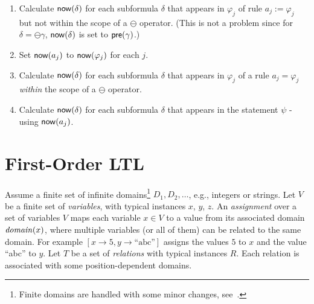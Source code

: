 \begin{enumerate}
\item Calculate 
$\mathsf{now} ( \delta )$ for each subformula $\delta$
that appears in $\varphi_j$ of rule
$a_j := \varphi_j$ but not within the scope of
a $\ominus$ operator. (This is not
a problem since for $\delta = \ominus \gamma$,
$\mathsf{now} ( \delta )$ is set to $\mathsf{pre} ( \gamma )$.)
\item Set 
$\mathsf{now} ( a_j )$ to $\mathsf{now} ( \varphi_j )$ for each $j$.
\item Calculate $\mathsf{now} ( \delta )$ for each subformula $\delta$
that appears in $\varphi_j$ of a rule
$a_j = \varphi_j$ {\em  within} the scope of
a $\ominus$ operator.
\item Calculate $\mathsf{now} ( \delta )$ for each subformula $\delta$
that appears in the statement $\psi$ - using $\mathsf{now} ( a_j )$.
\end{enumerate}



\section{First-Order LTL}

\label{sec:syntax-semantics}

Assume a finite set of infinite domains\footnote{Finite domains are handled with some minor changes, see~\cite{HPU}.}
$D_1, D_2, \ldots$,
e.g., integers or strings. 
Let $V$ be a finite set of {\em variables}, 
with typical instances $x$, $y$, $z$.
An {\em assignment} over a set of variables $V$
maps each variable $x \in V$ to a value from
its associated domain $\mathit{domain} ( x )$, where multiple variables (or all of them)
can be related to the same domain. For example
$[ x \rightarrow 5 , y \rightarrow \text{``abc''} ]$ assigns
the values $5$ to $x$ and the value ``abc'' to $y$.
Let $T$ be a set of {\em relations} 
with typical instances $R$.
Each relation is associated with some position-dependent domains.



